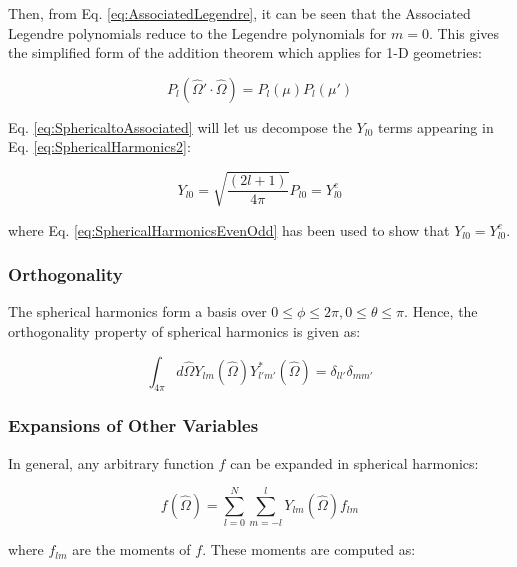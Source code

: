 \documentclass[10pt]{article}
\begin{document}
\begin{flushleft}
\begin{tcolorbox}[breakable]
Then, from Eq. \eqref{eq:AssociatedLegendre}, it can be seen that the Associated Legendre polynomials reduce to the Legendre polynomials for \(m=0\). This gives the simplified form of the addition theorem which applies for 1-D geometries:

\begin{equation}
\label{eq:AddSpherical1D}
P_l(\hat{\Omega}'\cdot\hat{\Omega})=P_{l}(\mu)P_{l}(\mu')
\end{equation}

\end{tcolorbox}



Eq. \eqref{eq:SphericaltoAssociated} will let us decompose the \(Y_{l0}\) terms appearing in Eq. \eqref{eq:SphericalHarmonics2}:

\begin{equation}
Y_{l0}=\sqrt{\frac{(2l+1)}{4\pi}}P_{l0}= Y_{l0}^e
\end{equation}

where Eq. \eqref{eq:SphericalHarmonicsEvenOdd} has been used to show that \(Y_{l0}=Y_{l0}^e\).



\subsubsection{Orthogonality}
The spherical harmonics form a basis over \(0\leq\phi\leq2\pi, 0\leq\theta\leq\pi\). Hence, the orthogonality property of spherical harmonics is given as:

\begin{equation}
\label{eq:SHOrthogonality}
\int_{4\pi}^{} d\hat{\Omega} Y_{lm}(\hat{\Omega}) Y_{l'm'}^{*}(\hat{\Omega}) = \delta_{ll'}\delta_{mm'}
\end{equation}



\subsubsection{Expansions of Other Variables}

In general, any arbitrary function \(f\) can be expanded in spherical harmonics:

\begin{equation}
\label{eq:SphericalHarmonicsGeneralExpansion}
f(\hat{\Omega})=\sum_{l=0}^{N}\sum_{m=-l}^{l}Y_{lm}(\hat{\Omega})f_{lm}
\end{equation}

where \(f_{lm}\) are the moments of \(f\). These moments are computed as:


\end{flushleft}
\end{document}

